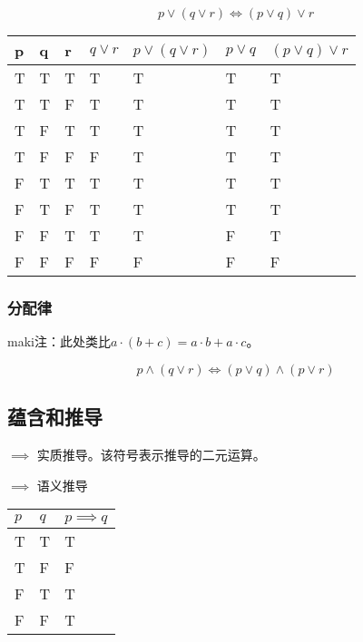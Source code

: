 \begin{equation}
    p \vee (q \vee r) \iff (p \vee q) \vee r
\end{equation}

\begin{table}[H]
    \begin{tabular}{lll|l|l|l|l}
    p & q & r & $q \vee r$ & $p \vee (q \vee r)$ & $p \vee q$ & $(p \vee q) \vee r$ \\ \hline
    T & T & T & T            & T                       & T            & T                       \\
    T & T & F & T            & T                       & T            & T                       \\
    T & F & T & T            & T                       & T            & T                       \\
    T & F & F & F            & T                       & T            & T                       \\
    F & T & T & T            & T                       & T            & T                       \\
    F & T & F & T            & T                       & T            & T                       \\
    F & F & T & T            & T                       & F            & T                       \\
    F & F & F & F            & F                       & F            & F                      
    \end{tabular}
\end{table}

\subsubsection{分配律}

maki注：此处类比$a \cdot (b + c) = a \cdot b + a \cdot c$。

\begin{equation}
    p \wedge (q \vee r) \iff (p \vee q) \wedge (p \vee r)
\end{equation}

\subsection{蕴含和推导}

$\implies$ 实质推导。该符号表示推导的二元运算。

$\implies$ 语义推导 

\begin{table}[H]
    \begin{tabular}{ll|l}
    $p$ & $q$   & $p \implies q$ \\ \hline 
    T   & T     & T            \\
    T   & F     & F            \\
    F   & T     & T            \\
    F   & F     & T                        
    \end{tabular}
\end{table}

